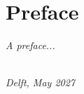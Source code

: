 \chapter*{Preface}

\emph{A preface...}

\begin{flushright}
{\makeatletter\itshape
    \@author \\
    Delft, May 2027 %
\makeatother}
\end{flushright}
